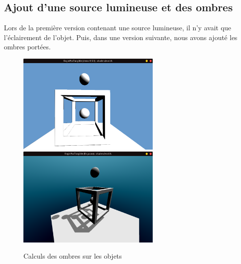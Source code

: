 \subsection{Ajout d'une source lumineuse et des ombres}
Lors de la première version contenant une source lumineuse, il n'y avait que l'éclairement de l'objet.
Puis, dans une version suivante, nous  avons ajouté les ombres portées.
\begin{figure}[h]
    \centering
    \includegraphics[width=7cm]{images/screens/ombresObjet.png}
    \includegraphics[width=7cm]{images/screens/ombresSurObjet.png}
    \caption{Calculs des ombres sur les objets}
    \label{fig:ombres}
\end{figure}
